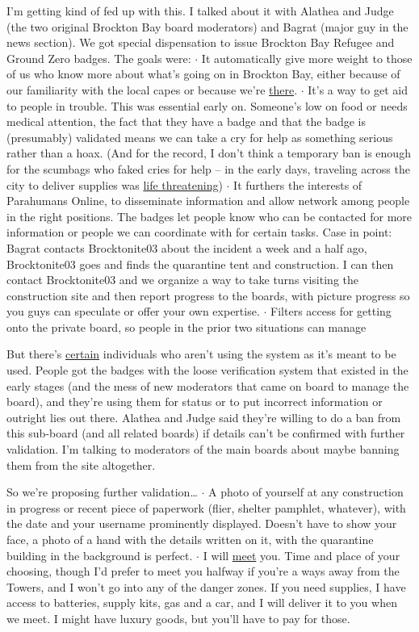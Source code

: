 I'm getting kind of fed up with this.  I talked about it with Alathea and Judge (the two original Brockton Bay board moderators) and Bagrat (major guy in the news section).  We got special dispensation to issue Brockton Bay Refugee and Ground Zero badges.  The goals were:
$\cdot$  It automatically give more weight to those of us who know more about what's going on in Brockton Bay, either because of our familiarity with the local capes or because we're \underline{there}.
$\cdot$  It's a way to get aid to people in trouble.  This was essential early on.  Someone's low on food or needs medical attention, the fact that they have a badge and that the badge is (presumably) validated means we can take a cry for help as something serious rather than a hoax.  (And for the record, I don't think a temporary ban is enough for the scumbags who faked cries for help – in the early days, traveling across the city to deliver supplies was \underline{life threatening})
$\cdot$  It furthers the interests of Parahumans Online, to disseminate information and allow network among people in the right positions.  The badges let people know who can be contacted for more information or people we can coordinate with for certain tasks.  Case in point: Bagrat contacts Brocktonite03 about the incident a week and a half ago, Brocktonite03 goes and finds the quarantine tent and construction.  I can then contact Brocktonite03 and we organize a way to take turns visiting the construction site and then report progress to the boards, with picture progress so you guys can speculate or offer your own expertise.
$\cdot$  Filters access for getting onto the private board, so people in the prior two situations can manage



But there's \underline{certain} individuals who aren't using the system as it's meant to be used.  People got the badges with the loose verification system that existed in the early stages (and the mess of new moderators that came on board to manage the board), and they're using them for status or to put incorrect information or outright lies out there.  Alathea and Judge said they're willing to do a ban from this sub-board (and all related boards) if details can't be confirmed with further validation.  I'm talking to moderators of the main boards about maybe banning them from the site altogether.



So we're proposing further validation\ldots
$\cdot$  A photo of yourself at any construction in progress or recent piece of paperwork (flier, shelter pamphlet, whatever), with the date and your username prominently displayed.  Doesn't have to show your face, a photo of a hand with the details written on it, with the quarantine building in the background is perfect.
$\cdot$  I will \underline{meet} you.  Time and place of your choosing, though I'd prefer to meet you halfway if you're a ways away from the Towers, and I won't go into any of the danger zones.  If you need supplies, I have access to batteries, supply kits, gas and a car, and I will deliver it to you when we meet.  I might have luxury goods, but you'll have to pay for those.



